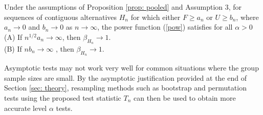 \documentclass[lineno]{biometrika}
\begin{document}
\begin{theorem}
	\label{prop: power}
	Under the assumptions of Proposition \ref{prop: pooled} and Assumption 3, for sequences of  contiguous alternatives  $H_{n}$ for which either $F \geq a_n$ or $U \geq b_n$, where  $a_n \rightarrow 0$ and $b_n \rightarrow 0$ as $n \rightarrow \infty$,   the power function (\ref{pow}) satisfies for all $\alpha >0$\\   %
	(A) If $n^{1/2} a_n \rightarrow \infty$, then 
	$\beta_{H_{n}} \rightarrow 1$. \\
	(B)  If  $nb_n \rightarrow \infty$ , then $\beta_{H_{n}} \rightarrow 1$.
\end{theorem}

Asymptotic tests may not work very well for common situations where the group sample sizes are small. By the asymptotic justification provided at the end of Section \ref{sec: theory},  %
resampling methods such as  bootstrap and permutation tests using the proposed test statistic $T_n$ can then  be used to obtain more accurate level $\alpha$ tests. 
\end{document}
